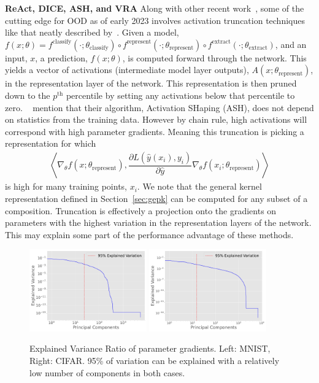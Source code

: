 \textbf{ReAct, DICE, ASH, and VRA}
Along with other recent work~\citep{sun2021, sun2022, xu2023vra}, some of the cutting edge for OOD as of early 2023 involves activation truncation techniques like that neatly described by~\citet{djurisic2023extremely}. 
Given a model, $f(x; \theta) = f^{\text{classify}}(\cdot; \theta_{\text{classify}}) \circ f^{\text{represent}}(\cdot; \theta_{\text{represent}}) \circ f^{\text{extract}}(\cdot; \theta_{\text{extract}})$, and an input, $x$, a prediction, $f(x; \theta)$, is computed forward through the network. 
This yields a vector of activations (intermediate model layer outputs), $A(x; \theta_{\text{represent}})$, in the representation layer of the network. 
This representation is then pruned down to the $p^{\text{th}}$
percentile by setting any activations below that percentile to
zero. ~\citet{djurisic2023extremely} mention that their algorithm,
Activation SHaping (ASH), does not depend on statistics from the
training data. However by chain rule, high activations will correspond with high parameter gradients. 
Meaning this truncation is picking a representation for which
\begin{align}
  \left\langle \nabla_\theta f(x; \theta_{\text{represent}}),
  \dfrac{\partial L(\hat y(x_i), y_i)}{\partial \hat y} \nabla_\theta f(x_i;
  \theta_{\text{represent}}) \right\rangle
\end{align}
is high for many training points, $x_i$. We note that the
general kernel representation defined in Section~\ref{sec:gepk} can be
computed for any subset of a composition. Truncation is effectively a
projection onto the gradients on parameters with
the highest variation in the representation layers of the network. 
This may explain some part of the performance advantage of these methods. 

\begin{figure}[t]
    \centering
    \includegraphics[width=0.45\textwidth]{c4a_figures/explained_variance_ratio.pdf}
    \includegraphics[width=0.45\textwidth]{c4a_figures/explained_variance_ratio_cifar.pdf}
    \caption{Explained Variance Ratio of parameter gradients. Left: MNIST, Right: CIFAR. 95\% of variation can be explained with a relatively low number of components in both cases.}
    \label{fig:rank}
\end{figure}

